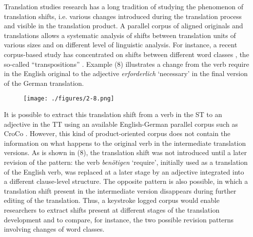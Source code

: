 \documentclass[output=paper]{LSP/langsci}
\begin{document}
Translation studies research has a long tradition of studying the phenomenon of translation shifts, i.e. various changes introduced during the translation process and visible in the translation product. A parallel corpus of aligned originals and translations allows a systematic analysis of shifts between translation units of various sizes and on different level of linguistic analysis. For instance, a recent corpus-based study has concentrated on shifts between different word classes \citep{Culo2008}, the so-called “transpositions” \citep[36]{Vinay1995/1958}. Example (8) illustrates a change from the verb require in the English original to the adjective \textit{erforderlich} ‘necessary’ in the final version of the German translation. 

\begin{figure}
\texttt{[image: ./figures/2-8.png]}
\end{figure}


It is possible to extract this translation shift from a verb in the ST to an adjective in the TT using an available English-German parallel corpus such as CroCo \citep{Hansen-Schirra2012}. However, this kind of product-oriented corpus does not contain the information on what happens to the original verb in the intermediate translation versions. As is shown in (8), the translation shift was not introduced until a later revision of the pattern: the verb \textit{benötigen} ‘require’, initially used as a translation of the English verb, was replaced at a later stage by an adjective integrated into a different clause-level structure. The opposite pattern is also possible, in which a translation shift present in the intermediate version disappears during further editing of the translation. Thus, a keystroke logged corpus would enable researchers to extract shifts present at different stages of the translation development and to compare, for instance, the two possible revision patterns involving changes of word classes.
  
\end{document}
